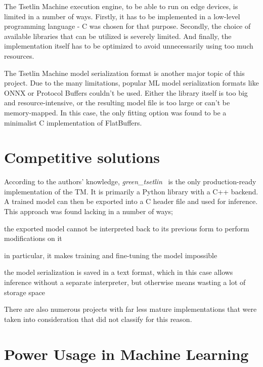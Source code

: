\documentclass[english]{aghengthesis} %
\newcommand*{\GreenTsetlinName}{\emph{green\_tsetlin}~\cite{glimsdal2024greentsetlin} }
\begin{document}
\vspace{10pt}
The Tsetlin Machine execution engine, to be able to run on edge devices, is limited in a number of ways. Firstly, it has to be implemented in a low-level programming language - C was chosen for that purpose. Secondly, the choice of available libraries that can be utilized is severely limited. And finally, the implementation itself has to be optimized to avoid unnecessarily using too much resources.

\vspace{10pt}
The Tsetlin Machine model serialization format is another major topic of this project. Due to the many limitations, popular ML model serialization formats like ONNX or Protocol Buffers couldn't be used. Either the library itself is too big and resource-intensive, or the resulting model file is too large or can't be memory-mapped. In this case, the only fitting option was found to be a minimalist C implementation of FlatBuffers.

\newpage
\section{Competitive solutions}
According to the authors' knowledge, \GreenTsetlinName is the only production-ready implementation of the TM. It is primarily a Python library with a C++ backend. A trained model can then be exported into a C header file and used for inference.  
This approach was found lacking in a number of ways;
\begin{compactenum}
    \item the exported model cannot be interpreted back to its previous form to perform modifications on it
    \item in particular, it makes training and fine-tuning the model impossible
    \item the model serialization is saved in a text format, which in this case allows inference without a separate interpreter, but otherwise means wasting a lot of storage space
\end{compactenum}

There are also numerous projects with far less mature implementations that were taken into consideration that did not classify for this reason. \cite{granmo2018tsetlinmachine, granmo2018tsetlinmachinec, granmo2020pytsetlinmachinecuda}

\section{Power Usage in Machine Learning}
\end{document}
